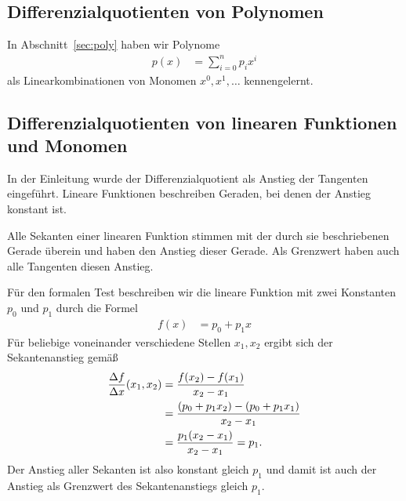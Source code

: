 \documentclass{article}
\begin{document}
\subsection{Differenzialquotienten von Polynomen}
In Abschnitt~\ref{sec:poly} haben wir Polynome
\begin{align*}
  p(x) &= \sum_{i=0}^n p_i x^i
\end{align*}
als Linearkombinationen von Monomen $x^0, x^1,\ldots$ kennengelernt.
\subsection{Differenzialquotienten von linearen Funktionen und Monomen}
In der Einleitung wurde der Differenzialquotient als Anstieg der
Tangenten eingeführt. Lineare Funktionen beschreiben Geraden, bei
denen der Anstieg konstant ist.

Alle Sekanten einer linearen Funktion stimmen mit der durch sie
beschriebenen Gerade überein und haben den Anstieg dieser
Gerade. Als Grenzwert haben auch alle Tangenten diesen Anstieg.

Für den formalen Test beschreiben wir die lineare Funktion mit zwei
Konstanten $p_0$ und $p_1$ durch die Formel
\begin{align*}
  f(x) &= p_0 + p_1 x
\end{align*}
Für beliebige voneinander verschiedene Stellen $x_1,x_2$ ergibt sich
der Sekantenanstieg gemäß
\begin{align}
  \frac{\Delta f}{\Delta x}(x_1,x_2) &= \frac{f(x_2) - f(x_1)}{x_2-x_1}\notag\\
                                     &= \frac{(p_0+p_1x_2) - (p_0+p_1x_1)}{x_2-x_1}\notag\\
                                     &= \frac{p_1(x_2-x_1)}{x_2-x_1} = p_1.\label{eq:limit:ddxp1}
\end{align}
Der Anstieg aller Sekanten ist also konstant gleich $p_1$ und damit
ist auch der Anstieg als Grenzwert des Sekantenanstiegs gleich $p_1$.
\end{document}
